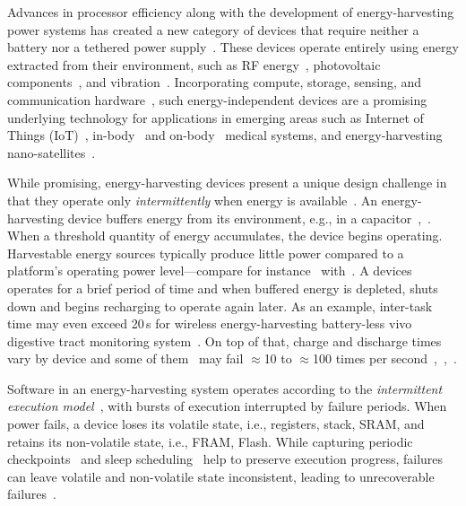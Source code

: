 Advances in processor efficiency along with the development of energy-harvesting power systems has created a new category of devices that require neither a battery nor a tethered power supply~\cite{prasad_comst_2014,lucia_snapl_2017,soyata_csm_2016}. These devices operate entirely using energy extracted from their environment, such as RF energy~\cite{rf_powered_computing_gollakota_2014}, photovoltaic components~\cite{margolies_infocom_2016,margolies_tosn_2016}, and vibration~\cite{gorlatova_sigmetrics_2014}. Incorporating compute, storage, sensing, and communication hardware~\cite{wisp5,moo}, such energy-independent devices are a promising underlying technology for applications in emerging areas such as Internet of Things (IoT)~\cite{ku_cst_2016}, in-body~\cite{nadeau_naturebio_2017} and on-body~\cite{bandodkar_electroanalysis_2015} medical systems, and energy-harvesting nano-satellites~\cite{kicksat}.

While promising, energy-harvesting devices present a unique design challenge in that they operate only {\em intermittently} when energy is available~\cite{hicks_isca_2017,lucia_snapl_2017}. An
energy-harvesting device buffers energy from its environment, e.g., in a capacitor~\cite[Fig. 3]{gorlatova_tmc_2013},~\cite[Fig. 1]{gunduz_commag_2014}. When a threshold quantity of energy accumulates, the device begins operating. Harvestable energy sources typically produce little power compared to a platform's operating power level---compare for instance~\cite[Table III and V]{prasad_comst_2014} with~\cite[Table I]{carrano_cst_2014}. A devices operates for a brief period of time and when buffered energy is depleted, shuts down and begins recharging to operate again later. As an example, inter-task time may even exceed 20\,s for wireless energy-harvesting battery-less vivo digestive tract monitoring system~\cite[Fig. 3c]{nadeau_naturebio_2017}. On top of that, charge and discharge times vary by device and some of them~\cite{wisp} may fail $\approx$10 to $\approx$100 times per second~\cite[Fig. 1]{tan_infocom_2016},~\cite[Fig. 1]{mementos},~\cite[Fig. 3]{nvp}.

Software in an energy-harvesting system operates according to the {\em intermittent execution model}~\cite{dino,lucia_snapl_2017}, with bursts of execution interrupted by failure periods. When power fails, a device loses its volatile state, i.e., registers, stack, SRAM, and retains its non-volatile state, i.e., FRAM, Flash. While capturing periodic checkpoints~\cite{mementos,quickrecall} and sleep scheduling~\cite{dewdrop,hibernus,hibernusplusplus} help to preserve execution progress, failures can leave volatile and non-volatile state inconsistent, leading to unrecoverable failures~\cite{mspcdino,edb}. 

